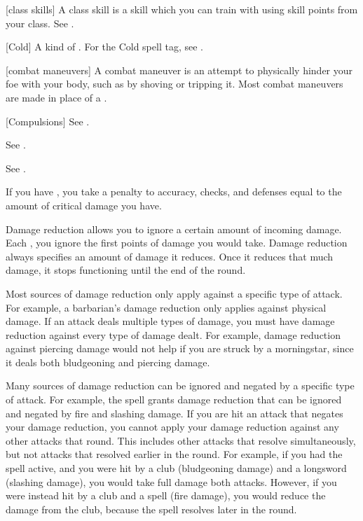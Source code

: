 [class skills] A class skill is a skill which you can train with using skill points from your class. See .

[Cold] A kind of . For the Cold spell tag, see .

[combat maneuvers] A combat maneuver is an attempt to physically hinder your foe with your body, such as by shoving or tripping it.
Most combat maneuvers are made in place of a .

[Compulsions] See .

 See .

 See .

 If you have , you take a penalty to accuracy, checks, and defenses equal to the amount of critical damage you have.

 Damage reduction allows you to ignore a certain amount of incoming damage.
Each , you ignore the first points of damage you would take.
Damage reduction always specifies an amount of damage it reduces.
Once it reduces that much damage, it stops functioning until the end of the round.

Most sources of damage reduction only apply against a specific type of attack.
For example, a barbarian's damage reduction only applies against physical damage.
If an attack deals multiple types of damage, you must have damage reduction against every type of damage dealt.
For example, damage reduction against piercing damage would not help if you are struck by a morningstar, since it deals both bludgeoning and piercing damage.

Many sources of damage reduction can be ignored and negated by a specific type of attack.
For example, the  spell grants damage reduction that can be ignored and negated by fire and slashing damage.
If you are hit an attack that negates your damage reduction, you cannot apply your damage reduction against any other attacks that round.
This includes other attacks that resolve simultaneously, but not attacks that resolved earlier in the round.
For example, if you had the  spell active, and you were hit by a club (bludgeoning damage) and a longsword (slashing damage), you would take full damage both attacks.
However, if you were instead hit by a club and a  spell (fire damage), you would reduce the damage from the club, because the spell resolves later in the round.

